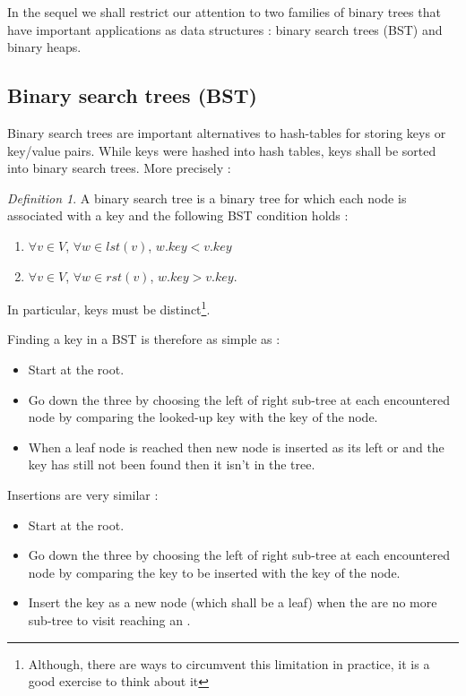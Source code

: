 \documentclass[12pt]{article}
\theoremstyle{plain}
\theoremstyle{remark}
\newtheorem*{definition}{Definition}
\begin{document}
In the sequel we shall restrict our attention to two families of binary trees
that have important applications as data structures : binary search trees (BST)
and binary heaps.

\subsection{Binary search trees (BST)}\label{subsec:bst}

Binary search trees are important alternatives to hash-tables for storing keys
or key/value pairs. While keys were hashed into hash tables, keys shall be sorted
into binary search trees. More precisely : 

\begin{definition} 
A binary search tree is a binary tree for which each node is associated with a key
and the following BST condition holds : 
	\begin{enumerate}
		\item $\forall v \in V$, $\forall w \in lst(v)$, $w.key < 
			v.key$
		\item $\forall v \in V$, $\forall w \in rst(v)$, $w.key > 
			v.key$.
	\end{enumerate}
\end{definition}

In particular, keys must be distinct\footnote{Although, there are ways to
circumvent this limitation in practice, it is a good exercise to think about it}.

\medskip

Finding a key in a BST is therefore as simple as :

\begin{itemize}
	\item Start at the root.
	\item Go down the three by choosing the left of right sub-tree at each
		encountered node by comparing the looked-up key with 
		the key of the node.
	\item When a leaf node is reached then new node is inserted as its left
		or and the key has still not been found then it
		isn't in the tree.
\end{itemize}

Insertions are very similar : 

\begin{itemize}
	\item Start at the root.
	\item Go down the three by choosing the left of right sub-tree at each
		encountered node by comparing the key to be inserted with 
		the key of the node.
	\item Insert the key as a new node (which shall be a leaf) when the 
		are no more sub-tree to visit reaching an .
\end{itemize}
\end{document}
